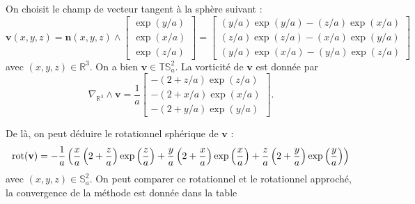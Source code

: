 On choisit le champ de vecteur tangent à la sphère suivant :
\begin{equation}
\mathbf{v}(x,y,z) = \mathbf{n}(x,y,z) \wedge \begin{bmatrix}
\exp (y/a) \\ \exp (x/a) \\ \exp (z/a)
\end{bmatrix} =
\begin{bmatrix}
(y/a) \exp (y/a) - (z/a) \exp (x/a)\\
(z/a) \exp (z/a) - (x/a) \exp (y/a)\\
(y/a) \exp (x/a) - (y/a) \exp (z/a)
\end{bmatrix} 
\label{eq:fun1_rot}
\end{equation}
avec $(x,y,z) \in \mathbb{R}^3$. On a bien $\mathbf{v} \in \mathbb{T}\mathbb{S}_a^2$.
La vorticité de $\mathbf{v}$ est donnée par
\begin{equation}
\nabla_{\mathbb{R}^3} \wedge \mathbf{v} = \dfrac{1}{a} \begin{bmatrix}
-(2+z/a) \exp (z/a)\\ -(2+x/a) \exp (x/a)\\ -(2+y/a) \exp (y/a)
\end{bmatrix}.
\end{equation}

De là, on peut déduire le rotationnel sphérique de $\mathbf{v}$ :
\begin{equation}
\text{rot} ( \mathbf{v} ) = - \dfrac{1}{a} \left( \dfrac{x}{a} \left( 2 + \dfrac{z}{a}  \right) \exp \left( \dfrac{z}{a} \right) + \dfrac{y}{a} \left( 2 + \dfrac{x}{a}  \right) \exp \left( \dfrac{x}{a} \right) + \dfrac{z}{a} \left( 2 + \dfrac{y}{a}  \right) \exp \left( \dfrac{y}{a} \right) \right)
\end{equation}
avec $(x,y,z) \in \mathbb{S}_a^2$. On peut comparer ce rotationnel et le rotationnel approché, la convergence de la méthode est donnée dans la table \REF

